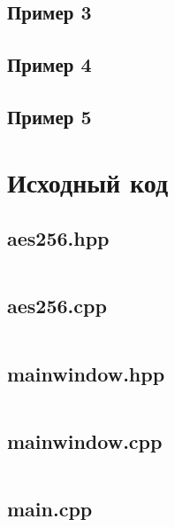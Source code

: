 \documentclass[utf8x, 14pt, bold, times]{G7-32} %
\begin{document}


\section{Пример 3}



\section{Пример 4}



\section{Пример 5}



\chapter{Исходный код}

\section{aes256.hpp}

\inputminted[fontsize=\footnotesize, breaklines]{cpp}{../../src/aes256.hpp}

\section{aes256.cpp}

\inputminted[fontsize=\footnotesize, breaklines]{cpp}{../../src/aes256.cpp}

\section{mainwindow.hpp}

\inputminted[fontsize=\footnotesize, breaklines]{cpp}{../../src/mainwindow.hpp}

\section{mainwindow.cpp}

\inputminted[fontsize=\footnotesize, breaklines]{cpp}{../../src/mainwindow.cpp}

\section{main.cpp}
\end{document}
